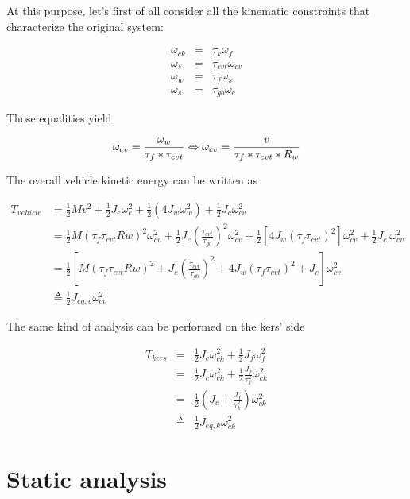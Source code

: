 \documentclass[11pt]{article}
\begin{document}
At this purpose, let's first of all consider all the kinematic constraints that characterize the original system:

\begin{eqnarray}
	\omega_{ck}&=&\tau_k \omega_f\\
	\omega_s &=&\tau_{cvt} \omega_{cv}\\
	\omega_w &=&\tau_f \omega_s\\
	\omega_s &=&\tau_{gb} \omega_e
\end{eqnarray}

Those equalities yield

\begin{equation}
\omega_{cv}=\frac{\omega_w}{\tau_f*\tau_{cvt}} \Leftrightarrow \omega_{cv}=\frac{v}{\tau_f*\tau_{cvt}*R_w}\\
\end{equation}
\vspace{1mm}

The overall vehicle kinetic energy can be written as

\begin{align}
T_{vehicle}&=\frac{1}{2}Mv^2+\frac{1}{2}J_e\omega_e^2+ \frac{1}{2}(4J_w\omega_w^2)+\frac{1}{2}J_c\omega_{cv}^2 \\
	 &=\frac{1}{2}M(\tau_f\tau_{cvt}Rw)^2\omega_{cv}^2+\frac{1}{2}J_e\left(\frac{\tau_{cvt}}{\tau_{gb}}\right)^2\omega_{cv}^2+\frac{1}{2}\left[4J_w\left(\tau_f \tau_{cvt}\right)^2\right]\omega_{cv}^2+\frac{1}{2}J_c\ \omega_{cv}^2\\
	 &=\frac{1}{2}\left[M(\tau_f\tau_{cvt}Rw)^2+J_e\left(\frac{\tau_{cvt}}{\tau_{gb}}\right)^2+4J_w\left(\tau_f \tau_{cvt}\right)^2+J_c\right] \omega_{cv}^2\\
	 & \triangleq \frac{1}{2}J_{eq,v}\omega_{cv}^2 
\end{align}
\vspace{1mm}

The same kind of analysis can be performed on the kers' side

\begin{eqnarray}
	T_{kers}&=&\frac{1}{2}J_c\omega_{ck}^2+\frac{1}{2}J_f\omega_f^2\\
	&=&\frac{1}{2}J_c\omega_{ck}^2+\frac{1}{2}\frac{J_f}{\tau_k^2}\omega_{ck}^2\\
	&=&\frac{1}{2}\left(J_c+\frac{J_f}{\tau_k^2}\right)\omega_{ck}^2\\
	&\triangleq & \frac{1}{2}J_{eq,k}\omega_{ck}^2
\end{eqnarray}

\section{Static analysis}
\end{document}
